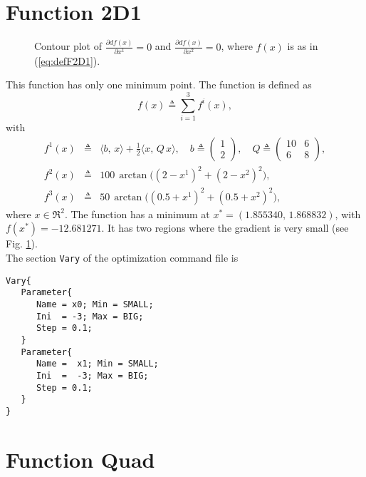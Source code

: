 \section{Function 2D1}
\begin{figure}
\centering
{}
\caption{Contour plot of $\frac{\partial d f(x)}{\partial x^1}=0$ and $\frac{\partial d f(x)}{\partial x^2}=0$, where $f(x)$ is as in (\ref{eq:defF2D1}).}
\label{fig:funTwoDOne}
\end{figure}

This function has only one minimum point.
The function is defined as
\begin{equation}
   f(x) \triangleq \sum_{i=1}^3 f^i(x),
  \label{eq:defF2D1}
\end{equation}
with
\begin{eqnarray}
  f^1(x) & \triangleq & \langle b, \, x \rangle + \frac{1}{2} \langle x, \, Q \, x \rangle, \quad b \triangleq 
\begin{pmatrix}  1 \\ 2 \end{pmatrix}, \quad
 Q \triangleq \begin{pmatrix} 10 & 6 \\ 6 & 8 \end{pmatrix},  \\
  f^2(x) & \triangleq & 100 \, \arctan \bigl( (2-x^1)^2 + (2 - x^2 )^2 \bigr), \\
   f^3(x) & \triangleq & 50 \, \arctan \bigl( (0.5 + x^1)^2 + (0.5 + x^2)^2   \bigr),
\end{eqnarray}
where $x \in \Re^2$.
The function has a minimum at $x^* = (1.855340, \, 1.868832)$,
with $f(x^*) = -12.681271$.
It has two regions where the gradient is very small (see Fig. \ref{fig:funTwoDOne}).\\

\pagebreak[4]
\noindent The section \texttt{Vary} of the optimization command file is
\begin{lstlisting}
Vary{
   Parameter{
      Name = x0; Min = SMALL;
      Ini  = -3; Max = BIG;
      Step = 0.1;
   }
   Parameter{
      Name =  x1; Min = SMALL;
      Ini  =  -3; Max = BIG;
      Step = 0.1;
   }
}
\end{lstlisting}

\section{Function Quad}

